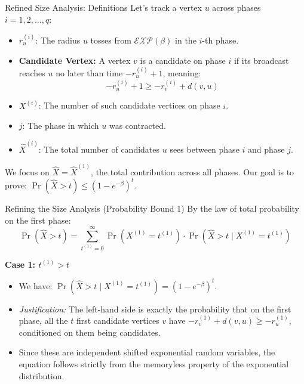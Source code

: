 \documentclass{beamer}
\begin{document}
\begin{frame}{Refined Size Analysis: Definitions}
    Let's track a vertex $u$ across phases $i = 1, 2, \dots, q$:
    \vspace{0.2cm}
    
    \begin{itemize}
        \item $r_u^{(i)}$: The radius $u$ tosses from $\mathcal{EXP}(\beta)$ in the $i$-th phase.
        \item \textbf{Candidate Vertex:} A vertex $v$ is a candidate on phase $i$ if its broadcast reaches $u$ no later than time $-r_u^{(i)} + 1$, meaning:
        \[ -r_u^{(i)} + 1 \ge -r_v^{(i)} + d(v,u) \]
        \item $X^{(i)}$: The number of such candidate vertices on phase $i$.
        \item $j$: The phase in which $u$ was contracted.
        \item $\hat{X}^{(i)}$: The total number of candidates $u$ sees between phase $i$ and phase $j$.
    \end{itemize}
    
    \vspace{0.2cm}
    We focus on $\hat{X} = \hat{X}^{(1)}$, the total contribution across all phases. Our goal is to prove: $\Pr(\hat{X} > t) \le (1 - e^{-\beta})^t$.
\end{frame}

\begin{frame}{Refining the Size Analysis (Probability Bound 1)}
    By the law of total probability on the first phase:
    \[ \Pr(\hat{X} > t) = \sum_{t^{(1)}=0}^\infty \Pr(X^{(1)} = t^{(1)}) \cdot \Pr(\hat{X} > t \mid X^{(1)} = t^{(1)}) \]
    
    \vspace{0.2cm}
    \textbf{Case 1: $t^{(1)} > t$}
    \begin{itemize}
        \item We have: $\Pr(\hat{X} > t \mid X^{(1)} = t^{(1)}) = (1 - e^{-\beta})^t$.
        \item \textit{Justification:} The left-hand side is exactly the probability that on the first phase, all the $t$ first candidate vertices $v$ have $-r_v^{(1)} + d(v,u) \ge -r_u^{(1)}$, conditioned on them being candidates.
        \item Since these are independent shifted exponential random variables, the equation follows strictly from the memoryless property of the exponential distribution.
    \end{itemize}
\end{frame}
\end{document}

